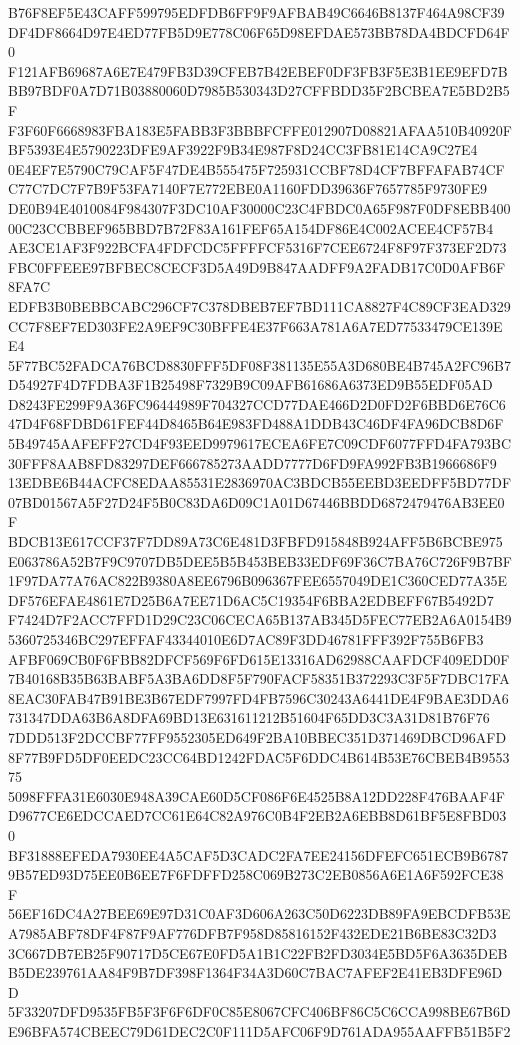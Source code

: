 \documentclass[UTF8,fontset=fandol,zihao=-4,a4paper]{ctexart}
\begin{document}
{{B76F8EF5E43CAFF599795EDFDB6FF9F9AFBAB49C6646B8137F464A98CF39DF4DF8664D97E4ED77FB5D9E778C06F65D98EFDAE573BB78DA4BDCFD64F0
F121AFB69687A6E7E479FB3D39CFEB7B42EBEF0DF3FB3F5E3B1EE9EFD7BBB97BDF0A7D71B03880060D7985B530343D27CFFBDD35F2BCBEA7E5BD2B5F
F3F60F6668983FBA183E5FABB3F3BBBFCFFE012907D08821AFAA510B40920FBF5393E4E5790223DFE9AF3922F9B34E987F8D24CC3FB81E14CA9C27E4
0E4EF7E5790C79CAF5F47DE4B555475F725931CCBF78D4CF7BFFAFAB74CFC77C7DC7F7B9F53FA7140F7E772EBE0A1160FDD39636F7657785F9730FE9
DE0B94E4010084F984307F3DC10AF30000C23C4FBDC0A65F987F0DF8EBB40000C23CCBBEF965BBD7B72F83A161FEF65A154DF86E4C002ACEE4CF57B4
AE3CE1AF3F922BCFA4FDFCDC5FFFFCF5316F7CEE6724F8F97F373EF2D73FBC0FFEEE97BFBEC8CECF3D5A49D9B847AADFF9A2FADB17C0D0AFB6F8FA7C
EDFB3B0BEBBCABC296CF7C378DBEB7EF7BD111CA8827F4C89CF3EAD329CC7F8EF7ED303FE2A9EF9C30BFFE4E37F663A781A6A7ED77533479CE139EE4
5F77BC52FADCA76BCD8830FFF5DF08F381135E55A3D680BE4B745A2FC96B7D54927F4D7FDBA3F1B25498F7329B9C09AFB61686A6373ED9B55EDF05AD
D8243FE299F9A36FC96444989F704327CCD77DAE466D2D0FD2F6BBD6E76C647D4F68FDBD61FEF44D8465B64E983FD488A1DDB43C46DF4FA96DCB8D6F
5B49745AAFEFF27CD4F93EED9979617ECEA6FE7C09CDF6077FFD4FA793BC30FFF8AAB8FD83297DEF666785273AADD7777D6FD9FA992FB3B1966686F9
13EDBE6B44ACFC8EDAA85531E2836970AC3BDCB55EEBD3EEDFF5BD77DF07BD01567A5F27D24F5B0C83DA6D09C1A01D67446BBDD6872479476AB3EE0F
BDCB13E617CCF37F7DD89A73C6E481D3FBFD915848B924AFF5B6BCBE975E063786A52B7F9C9707DB5DEE5B5B453BEB33EDF69F36C7BA76C726F9B7BF
1F97DA77A76AC822B9380A8EE6796B096367FEE6557049DE1C360CED77A35EDF576EFAE4861E7D25B6A7EE71D6AC5C19354F6BBA2EDBEFF67B5492D7
F7424D7F2ACC7FFD1D29C23C06CECA65B137AB345D5FEC77EB2A6A0154B95360725346BC297EFFAF43344010E6D7AC89F3DD46781FFF392F755B6FB3
AFBF069CB0F6FBB82DFCF569F6FD615E13316AD62988CAAFDCF409EDD0F7B40168B35B63BABF5A3BA6DD8F5F790FACF58351B372293C3F5F7DBC17FA
8EAC30FAB47B91BE3B67EDF7997FD4FB7596C30243A6441DE4F9BAE3DDA6731347DDA63B6A8DFA69BD13E631611212B51604F65DD3C3A31D81B76F76
7DDD513F2DCCBF77FF9552305ED649F2BA10BBEC351D371469DBCD96AFD8F77B9FD5DF0EEDC23CC64BD1242FDAC5F6DDC4B614B53E76CBEB4B955375
5098FFFA31E6030E948A39CAE60D5CF086F6E4525B8A12DD228F476BAAF4FD9677CE6EDCCAED7CC61E64C82A976C0B4F2EB2A6EBB8D61BF5E8FBD030
BF31888EFEDA7930EE4A5CAF5D3CADC2FA7EE24156DFEFC651ECB9B67879B57ED93D75EE0B6EE7F6FDFFD258C069B273C2EB0856A6E1A6F592FCE38F
56EF16DC4A27BEE69E97D31C0AF3D606A263C50D6223DB89FA9EBCDFB53EA7985ABF78DF4F87F9AF776DFB7F958D85816152F432EDE21B6BE83C32D3
3C667DB7EB25F90717D5CE67E0FD5A1B1C22FB2FD3034E5BD5F6A3635DEBB5DE239761AA84F9B7DF398F1364F34A3D60C7BAC7AFEF2E41EB3DFE96DD
5F33207DFD9535FB5F3F6F6DF0C85E8067CFC406BF86C5C6CCA998BE67B6DE96BFA574CBEEC79D61DEC2C0F111D5AFC06F9D761ADA955AAFFB51B5F2
}}
\end{document}
